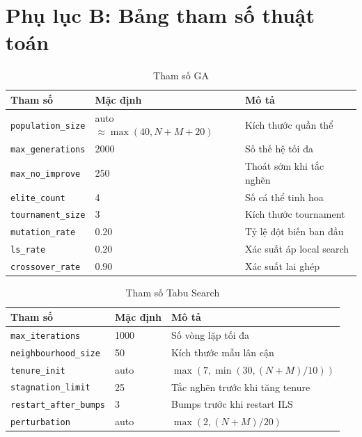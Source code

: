 \documentclass[12pt, a4paper]{article}
\begin{document}
\section*{Phụ lục B: Bảng tham số thuật toán}

\begin{table}[H]
\centering
\caption{Tham số GA}
\begin{tabular}{lll}
\toprule
\textbf{Tham số} & \textbf{Mặc định} & \textbf{Mô tả} \\
\midrule
\texttt{population\_size}  & auto $\approx \max(40, N{+}M{+}20)$ & Kích thước quần thể \\
\texttt{max\_generations}  & 2000    & Số thế hệ tối đa \\
\texttt{max\_no\_improve}  & 250     & Thoát sớm khi tắc nghẽn \\
\texttt{elite\_count}      & 4       & Số cá thể tinh hoa \\
\texttt{tournament\_size}  & 3       & Kích thước tournament \\
\texttt{mutation\_rate}    & 0.20    & Tỷ lệ đột biến ban đầu \\
\texttt{ls\_rate}          & 0.20    & Xác suất áp local search \\
\texttt{crossover\_rate}   & 0.90    & Xác suất lai ghép \\
\bottomrule
\end{tabular}
\end{table}

\begin{table}[H]
\centering
\caption{Tham số Tabu Search}
\begin{tabular}{lll}
\toprule
\textbf{Tham số} & \textbf{Mặc định} & \textbf{Mô tả} \\
\midrule
\texttt{max\_iterations}      & 1000  & Số vòng lặp tối đa \\
\texttt{neighbourhood\_size}  & 50    & Kích thước mẫu lân cận \\
\texttt{tenure\_init}         & auto  & $\max(7, \min(30, (N{+}M)/10))$ \\
\texttt{stagnation\_limit}    & 25    & Tắc nghẽn trước khi tăng tenure \\
\texttt{restart\_after\_bumps}& 3     & Bumps trước khi restart ILS \\
\texttt{perturbation}         & auto  & $\max(2, (N{+}M)/20)$ \\
\bottomrule
\end{tabular}
\end{table}
\end{document}

